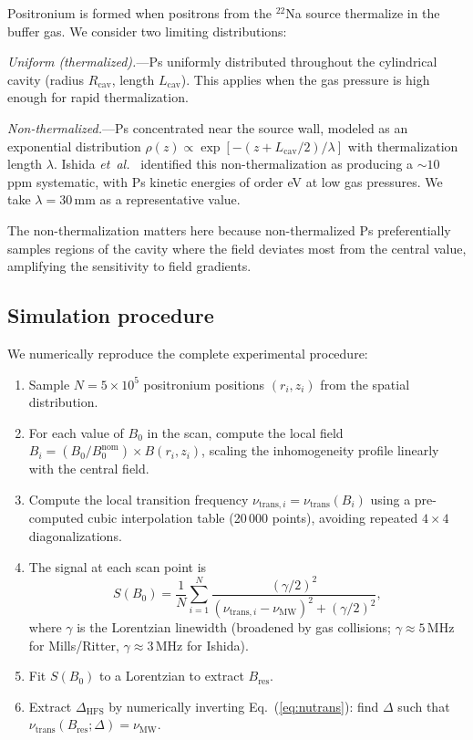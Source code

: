 \documentclass[twocolumn,pra,aps,superscriptaddress,floatfix,10pt]{revtex4-2}
\begin{document}
Positronium is formed when positrons from the $^{22}$Na source thermalize in the buffer gas. We consider two limiting distributions:

\textit{Uniform (thermalized).}---Ps uniformly distributed throughout the cylindrical cavity (radius $R_\mathrm{cav}$, length $L_\mathrm{cav}$). This applies when the gas pressure is high enough for rapid thermalization.

\textit{Non-thermalized.}---Ps concentrated near the source wall, modeled as an exponential distribution $\rho(z) \propto \exp[-(z + L_\mathrm{cav}/2)/\lambda]$ with thermalization length $\lambda$. Ishida \textit{et~al.}~\cite{Ishida2014} identified this non-thermalization as producing a $\sim 10$\,ppm systematic, with Ps kinetic energies of order eV at low gas pressures. We take $\lambda = 30$\,mm as a representative value.

The non-thermalization matters here because non-thermalized Ps preferentially samples regions of the cavity where the field deviates most from the central value, amplifying the sensitivity to field gradients.

\subsection{Simulation procedure}
\label{sec:simulation}

We numerically reproduce the complete experimental procedure:

\begin{enumerate}
  \item Sample $N = 5 \times 10^5$ positronium positions $(r_i, z_i)$ from the spatial distribution.
  \item For each value of $B_0$ in the scan, compute the local field $B_i = (B_0/B_0^\mathrm{nom}) \times B(r_i, z_i)$, scaling the inhomogeneity profile linearly with the central field.
  \item Compute the local transition frequency $\nu_{\mathrm{trans},i} = \nu_\mathrm{trans}(B_i)$ using a pre-computed cubic interpolation table (20\,000 points), avoiding repeated $4 \times 4$ diagonalizations.
  \item The signal at each scan point is
  \begin{equation}
    S(B_0) = \frac{1}{N}\sum_{i=1}^N \frac{(\gamma/2)^2}{(\nu_{\mathrm{trans},i} - \nu_\mathrm{MW})^2 + (\gamma/2)^2},
    \label{eq:signal}
  \end{equation}
  where $\gamma$ is the Lorentzian linewidth (broadened by gas collisions; $\gamma \approx 5$\,MHz for Mills/Ritter, $\gamma \approx 3$\,MHz for Ishida).
  \item Fit $S(B_0)$ to a Lorentzian to extract $B_\mathrm{res}$.
  \item Extract $\Delta_\mathrm{HFS}$ by numerically inverting Eq.~(\ref{eq:nutrans}): find $\Delta$ such that $\nu_\mathrm{trans}(B_\mathrm{res}; \Delta) = \nu_\mathrm{MW}$.
\end{enumerate}
\end{document}
